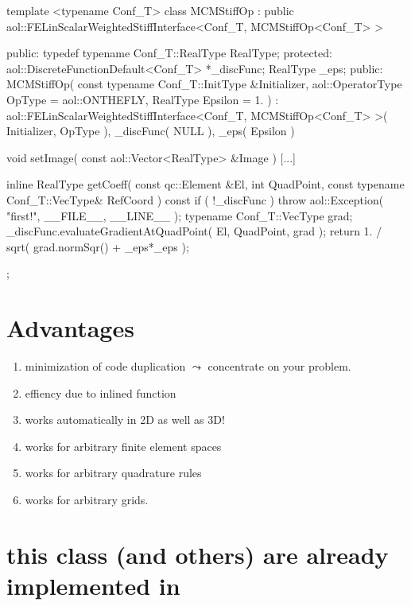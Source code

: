 {\small
\begin{myverbatim}
template <typename Conf_T>
class MCMStiffOp :
public aol::FELinScalarWeightedStiffInterface<Conf_T, MCMStiffOp<Conf_T> > {
public:
  typedef typename Conf_T::RealType RealType;
protected:
  aol::DiscreteFunctionDefault<Conf_T> *_discFunc;
  RealType _eps;
public:
  MCMStiffOp( const typename Conf_T::InitType &Initializer,
              aol::OperatorType OpType = aol::ONTHEFLY,
              RealType Epsilon = 1. )
: aol::FELinScalarWeightedStiffInterface<Conf_T, MCMStiffOp<Conf_T> >( Initializer, OpType ),
      _discFunc( NULL ), _eps( Epsilon )  {
  }

  void setImage( const aol::Vector<RealType> &Image ) { [...] }

  inline RealType getCoeff( const qc::Element &El, int QuadPoint,
                            const typename Conf_T::VecType& RefCoord ) const {
    if ( !_discFunc ) {  throw aol::Exception( "first!", __FILE__, __LINE__ );  }
    typename Conf_T::VecType grad;
    _discFunc.evaluateGradientAtQuadPoint( El, QuadPoint, grad );
    return 1. / sqrt( grad.normSqr() + _eps*_eps );
  }
};
\end{myverbatim}
}


\section{Advantages}
\begin{enumerate}
\item minimization of code duplication $\leadsto$ concentrate on your problem.
\item effiency due to inlined  function
\item works automatically in 2D as well as 3D!
\item works for arbitrary finite element spaces
\item works for arbitrary quadrature rules
\item works for arbitrary grids.
\end{enumerate}
\section{this class (and others) are already implemented in }



